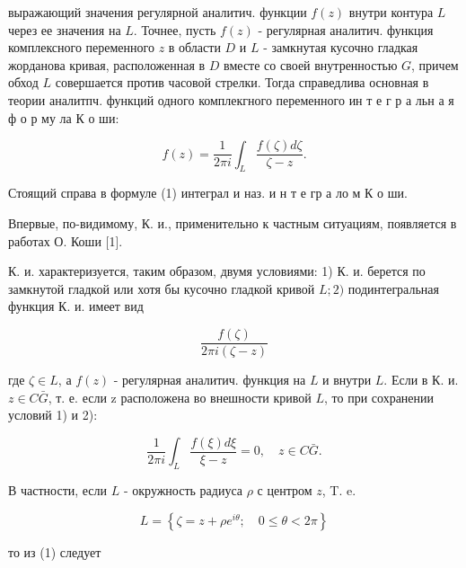 \documentclass[10pt]{article}
\begin{document}
выражающий значения регулярной аналитич. функции $f(z)$ внутри контура $L$ через ее значения на $L$. Точнее, пусть $f(z)$ - регулярная аналитич. функция комплексного переменного $z$ в области $D$ и $L$ - замкнутая кусочно гладкая жорданова кривая, расположенная в $D$ вместе со своей внутренностью $G$, причем обход $L$ совершается против часовой стрелки. Тогда справедлива основная в теории аналитпч. функций одного комплекгного переменного ин т е г р а льн а я ф о р му ла К о ши:



\[

f(z)=\frac{1}{2 \pi i} \int_{L} \frac{f(\zeta) d \zeta}{\zeta-z} .

\]



Стоящий справа в формуле (1) интеграл и наз. и н т е гр а ло м К о ши.



Впервые, по-видимому, К. и., применительно к частным ситуациям, появляется в работах О. Коши [1].



К. и. характеризуется, таким образом, двумя условиями: 1) К. и. берется по замкнутой гладкой или хотя бы кусочно гладкой кривой $L ; 2)$ подинтегральная функция К. и. имеет вид



\[

\frac{f(\zeta)}{2 \pi i(\zeta-z)}

\]



где $\zeta \in L$, а $f(z)$ - регулярная аналитич. функция на $L$ и внутри $L$. Если в К. и. $z \in C \bar{G}$, т. е. если z расположена во внешности кривой $L$, то при сохранении условий 1) и 2):



\[

\frac{1}{2 \pi i} \int_{L} \frac{f(\xi) d \xi}{\xi-z}=0, \quad z \in C \bar{G} .

\]



В частности, если $L$ - окружность радиуса $\rho$ с центром $z$, T. e.



\[

L=\left\{\zeta=z+\rho e^{i \theta} ; \quad 0 \leqslant \theta<2 \pi\right\}

\]



то из (1) следует
\end{document}
